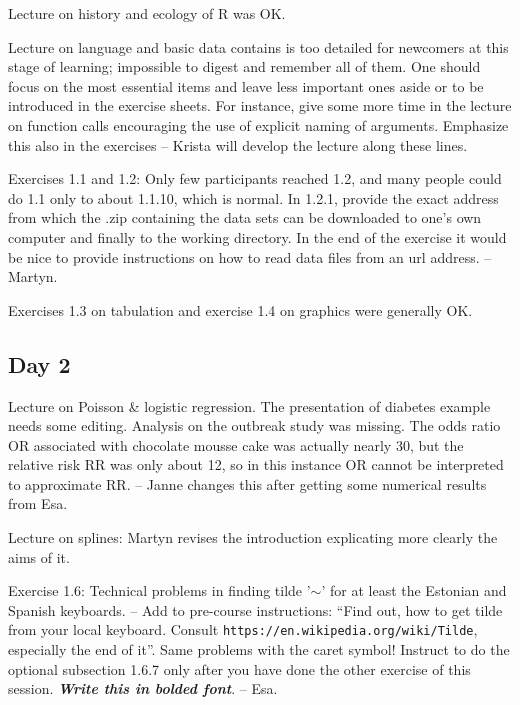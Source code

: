 Lecture on history and ecology of R was OK. 

Lecture on language and basic data 
contains is too detailed for newcomers at this stage of learning; 
impossible to digest and remember all of them. 
One should focus on the most essential items and leave less important ones aside or to be introduced in the exercise sheets.
For instance, give some more time in the lecture on function calls encouraging the use
of explicit naming of arguments. Emphasize this also in the exercises -- Krista
will develop the lecture along these lines.

Exercises 1.1 and 1.2: Only few participants reached 1.2, and many people could do 1.1 only to about 1.1.10, which is normal. 
In 1.2.1, provide the exact address from which the .zip containing the data sets can be downloaded to one's own computer and finally to the working directory.
In the end of the exercise it would be nice to provide instructions on how to read data files from an url address. -- Martyn.

Exercises 1.3 on tabulation and exercise 1.4 on graphics were generally OK. 

\subsection*{Day 2}

Lecture on Poisson \& logistic regression. 
The presentation of diabetes example needs some editing.
Analysis on the outbreak study was missing. 
The odds ratio OR associated with chocolate mousse cake was actually nearly 30, but the relative risk RR was only about 12, so in this instance OR cannot be interpreted to approximate RR.
-- Janne changes this after getting some numerical results from Esa.

Lecture on splines: Martyn revises the introduction explicating more clearly the aims of it.

Exercise 1.6: Technical problems in finding tilde '$\sim$' for at least the Estonian and Spanish keyboards. -- Add to pre-course instructions: ``Find out, how to get tilde from your local keyboard. Consult \verb|https://en.wikipedia.org/wiki/Tilde|, especially the end of it''.
Same problems with the caret symbol! 
Instruct to do the optional subsection 1.6.7 only after you have done the other exercise of this session. \textbf{\textit{Write this in bolded font}}.
-- Esa.

